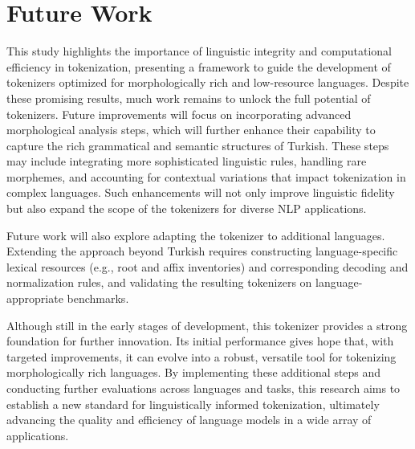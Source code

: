 \section{Future Work}
\label{sec:future_work}

This study highlights the importance of linguistic integrity and computational efficiency in tokenization, presenting a framework to guide the development of tokenizers optimized for morphologically rich and low-resource languages. Despite these promising results, much work remains to unlock the full potential of tokenizers. Future improvements will focus on incorporating advanced morphological analysis steps, which will further enhance their capability to capture the rich grammatical and semantic structures of Turkish. These steps may include integrating more sophisticated linguistic rules, handling rare morphemes, and accounting for contextual variations that impact tokenization in complex languages. Such enhancements will not only improve linguistic fidelity but also expand the scope of the tokenizers for diverse NLP applications.

Future work will also explore adapting the tokenizer to additional languages. Extending the approach beyond Turkish requires constructing language-specific lexical resources (e.g., root and affix inventories) and corresponding decoding and normalization rules, and validating the resulting tokenizers on language-appropriate benchmarks.

Although still in the early stages of development, this tokenizer provides a strong foundation for further innovation. Its initial performance gives hope that, with targeted improvements, it can evolve into a robust, versatile tool for tokenizing morphologically rich languages. By implementing these additional steps and conducting further evaluations across languages and tasks, this research aims to establish a new standard for linguistically informed tokenization, ultimately advancing the quality and efficiency of language models in a wide array of applications.
